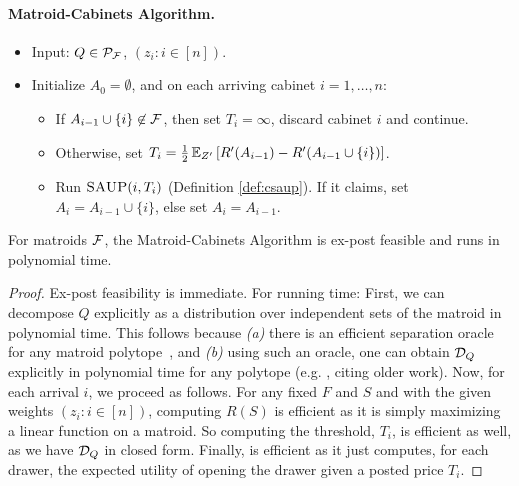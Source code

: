 \paragraph{Matroid-Cabinets Algorithm.}
\begin{itemize}
  \item Input: $Q \in \mathcal{P}_{\mathcal{F}}$, $(z_i : i \in [n])$.
  \item Initialize $A_0 = \emptyset$, and on each arriving cabinet $i=1,\dots,n$:
  \begin{itemize}
    \item If $A_{i-1} \cup \{i\} \not\in \mathcal{F}$, then set $T_i = \infty$, discard cabinet $i$ and continue.
    \item Otherwise, set $T_i = \frac{1}{2} \operatorname*{\mathbb{E}}_{Z'} \left[ R'(A_{i-1}) - R'(A_{i-1} \cup \{i\}) \right]$.
    \item Run $\textsc{SAUP}(i,T_i)$ (Definition \ref{def:csaup}). If it claims, set $A_i = A_{i-1} \cup \{i\}$, else set $A_i = A_{i-1}$.
  \end{itemize}
\end{itemize}

\begin{proposition} \label{prop:matroid-alg-efficient}
  For matroids $\mathcal{F}$, the Matroid-Cabinets Algorithm is ex-post feasible and runs in polynomial time.
\end{proposition}
\begin{proof}
  Ex-post feasibility is immediate.
  For running time:
  First, we can decompose $Q$ explicitly as a distribution over independent sets of the matroid in polynomial time.
  This follows because \emph{(a)} there is an efficient separation oracle for any matroid polytope~\citep{cunningham1984testing}, and \emph{(b)} using such an oracle, one can obtain $\mathcal{D}_Q$ explicitly in polynomial time for any polytope (e.g. \citet[Theorem 4]{cai2017constructive}, citing older work).
  Now, for each arrival $i$, we proceed as follows.
  For any fixed $F$ and $S$ and with the given weights $(z_i : i \in [n])$, computing $R(S)$ is efficient as it is simply maximizing a linear function on a matroid.
  So computing the threshold, $T_i$, is efficient as well, as we have $\mathcal{D}_Q$ in closed form.
  Finally, \SAUP{} is efficient as it just computes, for each drawer, the expected utility of opening the drawer given a posted price $T_i$.
\end{proof}


